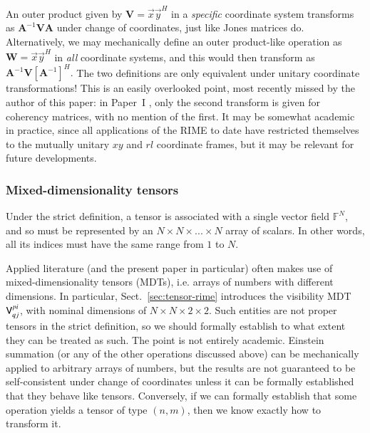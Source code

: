 \documentclass{aa}
\newcommand{\herm}{H}
\begin{document}
An outer product given by $\mathbf{V}=\vec x \vec y^\herm$ in a \emph{specific} coordinate system transforms as $\mathbf{A}^{-1}\mathbf{V}\mathbf{A}$ under change of coordinates, just like Jones matrices do. Alternatively, we may mechanically define an outer product-like operation as $\mathbf{W}=\vec x \vec y^\herm$ in \emph{all} coordinate systems, and this would then transform as $\mathbf{A}^{-1}\mathbf{V}[\mathbf{A}^{-1}]^\herm.$ The two definitions are only equivalent under unitary coordinate transformations! This is an easily overlooked point, most recently missed by the author of this paper: in Paper~I 
\citep[Sect.~6.3]{RRIME1}, only the second transform is given for coherency matrices, with no mention of the first. It may be somewhat academic in practice, since all applications of the RIME to date have restricted themselves to the mutually unitary $xy$ and $rl$ coordinate frames, but it may be relevant for future developments.

\subsubsection{Mixed-dimensionality tensors}
\label{sec:tensors-mixed-dim}

Under the strict definition, a tensor is associated with a single vector field $\mathbb{F}^N$, and so must be represented by an $N\times N\times...\times N$ array of scalars. In other words, all its indices must have the same range from $1$ to $N$.

Applied literature (and the present paper in particular) often makes use of mixed-dimensionality tensors (MDTs), i.e. arrays of numbers with different dimensions. In particular, Sect.~\ref{sec:tensor-rime} introduces the visibility MDT $\mathsf{V}^{pi}_{qj}$, with nominal dimensions of $N\times N\times 2\times2$. Such entities are not proper tensors in the strict definition, so we should formally establish to what extent they can be treated as such. The point is not entirely academic. Einstein summation (or any of the other operations discussed above) can be mechanically 
applied to arbitrary arrays of numbers, but the results are not guaranteed to be self-consistent under change of coordinates unless it can be formally established that they behave like tensors. Conversely, if we can formally establish that some operation yields a tensor of type $(n,m)$, then we know exactly how to transform it.
\end{document}
